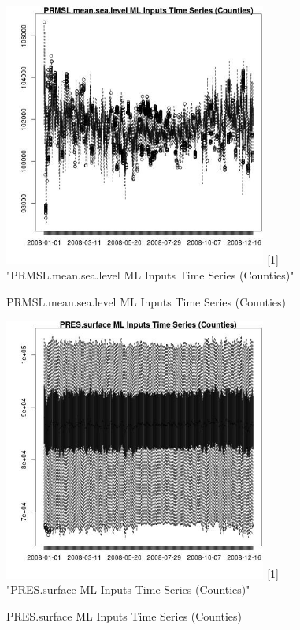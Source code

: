 \begin{figure} 
\centering  
\includegraphics[width=0.77\textwidth]{Code_Outputs/ML_input_report_ML_input_CountyGeometricCentroids_Locations_Dates_part_c_2008-01-01to2008-12-31_PRMSL.mean.sea.levelTS.jpg} 
[1] "PRMSL.mean.sea.level ML Inputs Time Series (Counties)"
\caption{\label{fig:ML_input_report_ML_input_CountyGeometricCentroids_Locations_Dates_part_c_2008-01-01to2008-12-31PRMSL.mean.sea.levelTS}PRMSL.mean.sea.level ML Inputs Time Series (Counties)} 
\end{figure} 
 

\begin{figure} 
\centering  
\includegraphics[width=0.77\textwidth]{Code_Outputs/ML_input_report_ML_input_CountyGeometricCentroids_Locations_Dates_part_c_2008-01-01to2008-12-31_PRES.surfaceTS.jpg} 
[1] "PRES.surface ML Inputs Time Series (Counties)"
\caption{\label{fig:ML_input_report_ML_input_CountyGeometricCentroids_Locations_Dates_part_c_2008-01-01to2008-12-31PRES.surfaceTS}PRES.surface ML Inputs Time Series (Counties)} 
\end{figure} 
 

